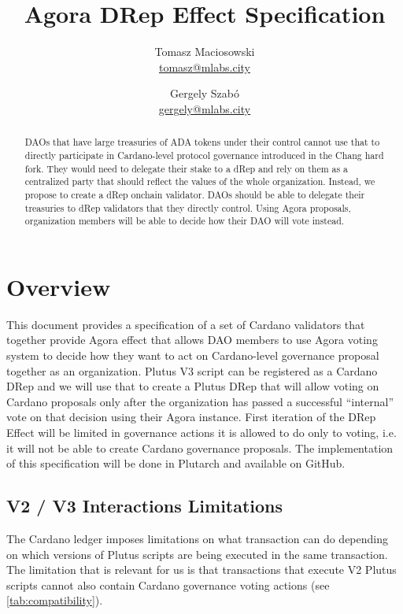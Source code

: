\documentclass{article}
\begin{document}
\title{\textbf{Agora DRep Effect Specification}}
\author{
  Tomasz Maciosowski\\\href{mailto:tomasz@mlabs.city}{tomasz@mlabs.city} \and
  Gergely Szab\'o \\\href{mailto:gergely@mlabs.city}{gergely@mlabs.city}}
\date{}

\clearpage
\maketitle
\vskip 5mm
\begin{abstract}
  DAOs that have large treasuries of ADA tokens under their control cannot use that to directly participate in Cardano-level protocol governance introduced in the Chang hard fork.
  They would need to delegate their stake to a dRep and rely on them as a centralized party that should reflect the values of the whole organization.
  Instead, we propose to create a dRep onchain validator.
  DAOs should be able to delegate their treasuries to dRep validators that they directly control.
  Using Agora proposals, organization members will be able to decide how their DAO will vote instead.
\end{abstract}
\vskip 5mm
\section{Overview}

This document provides a specification of a set of Cardano validators that together provide Agora effect that
allows DAO members to use Agora voting system to decide how they want to act on Cardano-level governance proposal together as an organization.
Plutus V3 script can be registered as a Cardano DRep and we will use that to create a Plutus DRep that will allow voting on Cardano proposals only after the organization has passed a successful ``internal'' vote on that decision using their Agora instance.
First iteration of the DRep Effect will be limited in governance actions it is allowed to do only to voting, i.e. it will not be able to create Cardano governance proposals.
The implementation of this specification will be done in Plutarch and available on GitHub.

\subsection{V2 / V3 Interactions Limitations}

The Cardano ledger imposes limitations on what transaction can do depending on which versions of Plutus scripts are being executed in the same transaction.
The limitation that is relevant for us is that transactions that execute V2 Plutus scripts cannot also contain Cardano governance voting actions (see \ref{tab:compatibility}).
\end{document}
